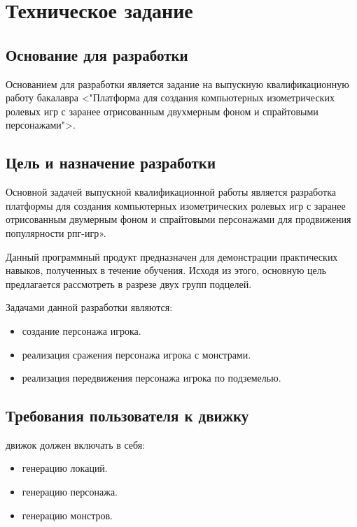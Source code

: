 \section{Техническое задание}
\subsection{Основание для разработки}

Основанием для разработки является задание на выпускную квалификационную работу бакалавра <"Платформа для создания компьютерных изометрических ролевых игр с заранее отрисованным двухмерным фоном и спрайтовыми персонажами">.

\subsection{Цель и назначение разработки}

Основной задачей выпускной квалификационной работы является разработка платформы для создания компьютерных изометрических ролевых игр с заранее отрисованным двумерным фоном и спрайтовыми персонажами для продвижения популярности рпг-игр».

Данный программный продукт предназначен для демонстрации практических навыков, полученных в течение обучения. Исходя из этого, основную цель предлагается рассмотреть в разрезе двух групп подцелей.

Задачами данной разработки являются:
\begin{itemize}
\item создание персонажа игрока.
\item реализация сражения персонажа игрока с монстрами.
\item реализация передвижения персонажа игрока по подземелью.
\end{itemize}

\subsection{Требования пользователя к движку}

движок должен включать в себя:
\begin{itemize}
    \item генерацию локаций.
    \item генерацию персонажа.
    \item генерацию монстров.
\end{itemize}

